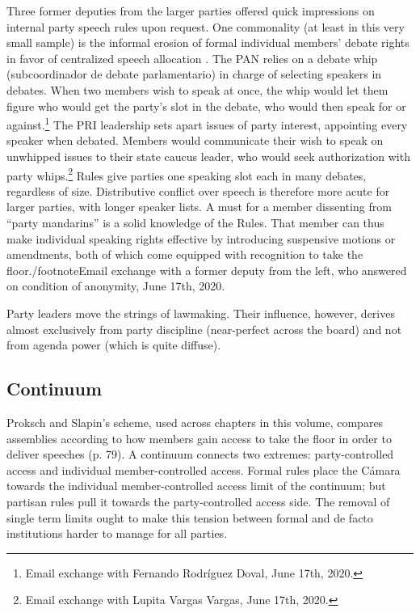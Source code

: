 \documentclass[letter,12pt]{article}
\begin{document}
Three former deputies from the larger parties offered quick impressions on internal party speech rules upon request. One commonality (at least in this very small sample) is the informal erosion of formal individual members' debate rights in favor of centralized speech allocation \citep[cf.][]{cox.1987}. The PAN relies on a debate whip (subcoordinador de debate parlamentario) in charge of selecting speakers in debates. When two members wish to speak at once, the whip would let them figure who would get the party's slot in the debate, who would then speak for or against.\footnote{Email exchange with Fernando Rodríguez Doval, June 17th, 2020.} The PRI leadership sets apart issues of party interest, appointing every speaker when debated. Members would communicate their wish to speak on unwhipped issues to their state caucus leader, who would seek authorization with party whips.\footnote{Email exchange with Lupita Vargas Vargas, June 17th, 2020.} Rules give parties one speaking slot each in many debates, regardless of size. Distributive conflict over speech is therefore more acute for larger parties, with longer speaker lists. A must for a member dissenting from ``party mandarins'' is a solid knowledge of the Rules. That member can thus make individual speaking rights effective by introducing suspensive motions or amendments, both of which come equipped with recognition to take the floor./footnote{Email exchange with a former deputy from the left, who answered on condition of anonymity, June 17th, 2020.} 

Party leaders move the strings of lawmaking. Their influence, however, derives almost exclusively from party discipline (near-perfect across the board) and not from agenda power (which is quite diffuse). 

  \subsection{Continuum}

Proksch and Slapin's \citeyearpar{proksch-slapin2015book} scheme, used across chapters in this volume, compares assemblies according to how members gain access to take the floor in order to deliver speeches (p. 79). A continuum connects two extremes: party-controlled access and individual member-controlled access. Formal rules place the Cámara towards the individual member-controlled access limit of the continuum; but partisan rules pull it towards the party-controlled access side. The removal of single term limits ought to make this tension between formal and de facto institutions harder to manage for all parties.  
\end{document}
